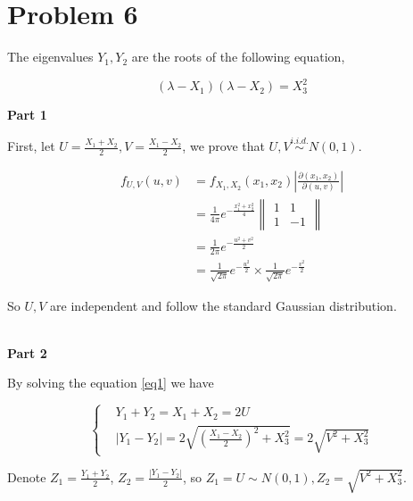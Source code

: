 \documentclass{article}
\begin{document}
\section{Problem 6}

The eigenvalues $Y_1,Y_2$ are the roots of the following equation,

\begin{equation}\label{eq1}
    (\lambda-X_1)(\lambda-X_2) = X_3^2
\end{equation}

\textbf{Part 1}

First, let $U=\frac {X_1+X_2} 2,V = \frac {X_1-X_2} 2$, we prove that $U,V \overset{i.i.d.}{\sim} N(0,1)$.

\begin{equation}
    \begin{aligned}
        f_{U,V}(u, v) & =f_{X_1,X_2}(x_1, x_2)\left|\frac{\partial(x_1, x_2)}{\partial(u, v)}\right| \\
        & = \frac {1} {4\pi } e^{-\frac {x_1^2+x_2^2}{4}} \left\|\begin{matrix}
            1  & 1 \\ 
            1 &  -1
        \end{matrix}\right\| \\
        &  = \frac {1}{2\pi} e^{-\frac{u^2 + v^2}{2}} \\
        & = \frac{1}{\sqrt{2\pi}} e^{-\frac{u^2}{2}} \times \frac{1}{\sqrt{2\pi}} e^{-\frac{v^2}{2}}
    \end{aligned}
\end{equation}

So $U,V$ are independent and follow the standard Gaussian distribution.

~\\

\textbf{Part 2}

By solving the equation \ref{eq1} we have 

\begin{equation}
    \left\{
    \begin{aligned}
        &Y_1 +Y_2 = X_1+X_2 = 2U \\
        &|Y_1 -Y_2| = 2\sqrt{\left(\frac{X_1-X_2}{2}\right)^2 + X_3^2} = 2\sqrt{V^2 + X_3^2}
    \end{aligned}
    \right.
\end{equation}

Denote $Z_1= \frac{Y_1+Y_2}{2}$, $Z_2 = \frac{|Y_1 -Y_2|}{2}$, so $Z_1 = U \sim N(0,1),Z_2 = \sqrt{V^2+X_3^2}$.
\end{document}
